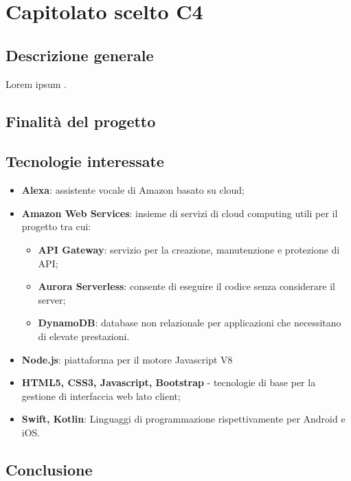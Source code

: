 \chapter{Capitolato scelto C4}
\section{Descrizione generale}
Lorem ipsum .\\
\section{Finalit\`a del progetto}

\section{Tecnologie interessate}
\begin{itemize}
	\item \textbf{Alexa}: assistente vocale di Amazon basato su cloud;
	\item \textbf{Amazon Web Services}: insieme di servizi di cloud computing utili per il progetto tra cui:
	\begin{itemize}
	\item \textbf{API Gateway}: servizio per la creazione, manutenzione e protezione di API;
	\item \textbf{Aurora Serverless}: consente di eseguire il codice senza considerare il server;
	\item \textbf{DynamoDB}: database non relazionale per applicazioni che necessitano di elevate prestazioni.
	\end{itemize}
	\item \textbf{Node.js}: piattaforma per il motore Javascript V8
	\item \textbf{HTML5, CSS3, Javascript, Bootstrap} - tecnologie di base per la gestione di interfaccia web lato client;
	\item \textbf{Swift, Kotlin}: Linguaggi di programmazione rispettivamente per Android e iOS.
\end{itemize}


\section{Conclusione}

